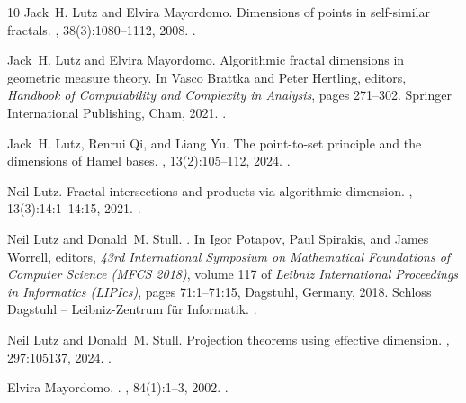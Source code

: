 \documentclass[a4paper,oneside,reqno,12pt]{amsart}
\theoremstyle{plain}
\theoremstyle{definition}
\theoremstyle{remark}
\begin{document}
\begin{thebibliography}{10}
Jack~H. Lutz and Elvira Mayordomo.
\newblock Dimensions of points in self-similar fractals.
, 38(3):1080--1112, 2008.
\newblock \href {https://doi.org/10.1137/070684689}
{}.

Jack~H. Lutz and Elvira Mayordomo.
\newblock Algorithmic fractal dimensions in geometric measure theory.
\newblock In Vasco Brattka and Peter Hertling, editors, {\em Handbook of Computability and Complexity in Analysis}, pages 271--302. Springer International Publishing, Cham, 2021.
\newblock \href {https://doi.org/10.1007/978-3-030-59234-9_8} {}.

Jack~H. Lutz, Renrui Qi, and Liang Yu.
\newblock The point-to-set principle and the dimensions of {Hamel} bases.
, 13(2):105--112, 2024.
\newblock \href {https://doi.org/10.3233/COM-210383} {}.

Neil Lutz.
\newblock Fractal intersections and products via algorithmic dimension.
, 13(3):14:1--14:15, 2021.
\newblock \href {https://doi.org/10.1145/3460948} {}.

Neil Lutz and Donald~M. Stull.
.
\newblock In Igor Potapov, Paul Spirakis, and James Worrell, editors, {\em 43rd International Symposium on Mathematical Foundations of Computer Science (MFCS 2018)}, volume 117 of {\em Leibniz International Proceedings in Informatics (LIPIcs)}, pages 71:1--71:15, Dagstuhl, Germany, 2018. Schloss Dagstuhl -- Leibniz-Zentrum f{\"u}r Informatik.
\newblock \href {https://doi.org/10.4230/LIPIcs.MFCS.2018.71} {}.

Neil Lutz and Donald~M. Stull.
\newblock Projection theorems using effective dimension.
, 297:105137, 2024.
\newblock \href {https://doi.org/10.1016/j.ic.2024.105137} {}.

Elvira Mayordomo.
.
, 84(1):1--3, 2002.
\newblock \href {https://doi.org/10.1016/S0020-0190(02)00343-5} {}.


\end{thebibliography}
\end{document}
